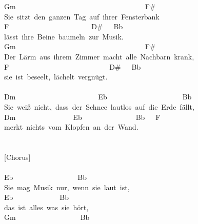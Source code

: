 \documentclass[]{book}
\begin{document}
Gm~~~~~~~~~~~~~~~~~~~~~~~~~~~~~~~~~~~~F\#\\
Sie~sitzt~den~ganzen~Tag~auf~ihrer~Fensterbank\\
F~~~~~~~~~~~~~~~~~~~~~~~D\#~~~Bb\\
lässt~ihre~Beine~baumeln~zur~Musik.\\
Gm~~~~~~~~~~~~~~~~~~~~~~~~~~~~~~~~~~~~F\#\\
Der~Lärm~aus~ihrem~Zimmer~macht~alle~Nachbarn~krank,\\
F~~~~~~~~~~~~~~~~~~~~~~~~~~~~D\#~~~Bb\\
sie~ist~beseelt,~lächelt~vergnügt.\\
~\\
Dm~~~~~~~~~~~~~~~~~~~~~~~Eb~~~~~~~~~~~~~~~~~~~~~Bb\\
Sie~weiß~nicht,~dass~der~Schnee~lautlos~auf~die~Erde~fällt,\\
Dm~~~~~~~~~~~~~~~~Eb~~~~~~~~~~~~~~~Bb~~~F\\
merkt~nichts~vom~Klopfen~an~der~Wand.\\
~\\
~\\
{[}Chorus{]}\\
~\\
\hspace*{0.333em}\hspace*{0.333em}\hspace*{0.333em}\hspace*{0.333em}\hspace*{0.333em}\hspace*{0.333em}\hspace*{0.333em}\hspace*{0.333em}Eb~~~~~~~~~~~~~~~~~~Bb\\
Sie~mag~Musik~nur,~wenn~sie~laut~ist,\\
\hspace*{0.333em}\hspace*{0.333em}\hspace*{0.333em}\hspace*{0.333em}\hspace*{0.333em}\hspace*{0.333em}\hspace*{0.333em}\hspace*{0.333em}Eb~~~~~~~~~~~~~Bb\\
das~ist~alles~was~sie~hört,\\
\hspace*{0.333em}\hspace*{0.333em}\hspace*{0.333em}\hspace*{0.333em}\hspace*{0.333em}\hspace*{0.333em}\hspace*{0.333em}\hspace*{0.333em}Gm~~~~~~~~~~~~~~~~~~Bb\\
\end{document}
